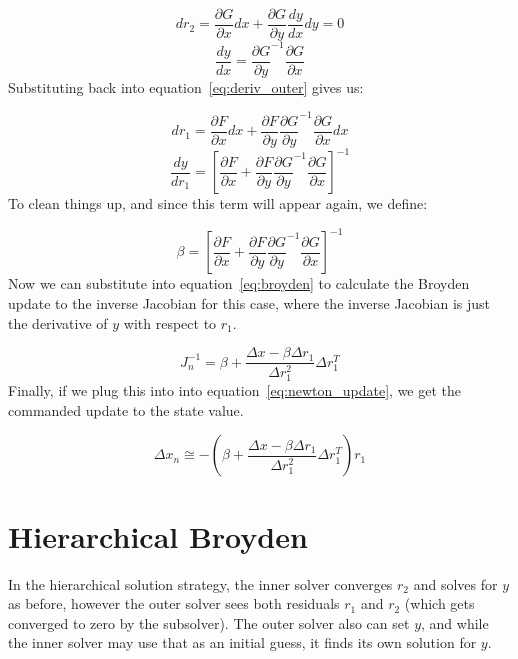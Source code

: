 \documentclass{article}
\begin{document}
\begin{equation}
  dr_2 = \frac{\partial G}{\partial x} dx + \frac{\partial G}{\partial y} \frac{dy}{dx} dy = 0
\end{equation}
\begin{equation}
  \frac{dy}{dx} = {\frac{\partial G}{\partial y}}^{-1} \frac{\partial G}{\partial x}
\end{equation}
Substituting back into equation~\eqref{eq:deriv_outer} gives us:

\begin{equation}
  dr_1 = \frac{\partial F}{\partial x} dx + \frac{\partial F}{\partial y} {\frac{\partial G}{\partial y}}^{-1} \frac{\partial G}{\partial x} dx
\end{equation}
\begin{equation}
  \frac{dy}{dr_1} = \left[ \frac{\partial F}{\partial x} + \frac{\partial F}{\partial y} {\frac{\partial G}{\partial y}}^{-1} \frac{\partial G}{\partial x} \right]^{-1}
\end{equation}
To clean things up, and since this term will appear again, we define:

\begin{equation}
  \beta = \left[ \frac{\partial F}{\partial x} + \frac{\partial F}{\partial y} {\frac{\partial G}{\partial y}}^{-1} \frac{\partial G}{\partial x} \right]^{-1} \label{eq:beta}
\end{equation}
Now we can substitute into equation~\eqref{eq:broyden} to calculate the Broyden update to the inverse Jacobian for this case, where the inverse Jacobian is just the
derivative of $y$ with respect to $r_1$.

\begin{equation}
  J_n^{-1} = \beta + \frac{\Delta x - \beta \Delta r_{1}}{\Delta r_{1}^2 } \Delta r_{1}^T
\end{equation}
Finally, if we plug this into into equation~\eqref{eq:newton_update}, we get the commanded update to the state value.

\begin{equation}
  \Delta x_n \cong  -(\beta + \frac{\Delta x - \beta \Delta r_{1}}{\Delta r_{1}^2 } \Delta r_{1}^T )r_{1} \label{eq:recursive_final}
\end{equation}


\section{Hierarchical Broyden}

In the hierarchical solution strategy, the inner solver converges $r_2$ and solves for $y$ as before, however the outer solver sees both residuals
$r_1$ and $r_2$ (which gets converged to zero by the subsolver). The outer solver also can set $y$, and while the inner solver may use that as an initial
guess, it finds its own solution for $y$.
\end{document}
